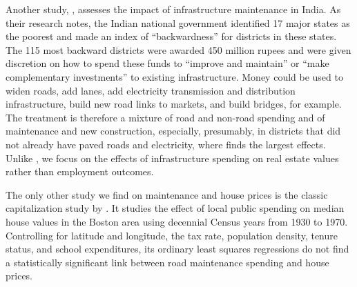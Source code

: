 Another study, \cite{chaurey2022}, assesses the impact of infrastructure maintenance in India. As their research notes, the Indian national government identified 17 major states as the poorest and made an index of ``backwardness'' for districts in these states. The 115 most backward districts were awarded 450 million rupees and were given discretion on how to spend these funds to ``improve and maintain'' or ``make complementary investments'' to existing infrastructure.  Money could be used to widen roads, add lanes, add electricity transmission and distribution infrastructure, build new road links to markets, and build bridges, for example.  The treatment is therefore a mixture of road and non-road spending and of maintenance and new construction, especially, presumably, in districts that did not already have paved roads and electricity, where \cite{chaurey2022} finds the largest effects. 
Unlike \cite{chaurey2022}, we focus on the effects of infrastructure spending on real estate values rather than employment outcomes.

The only other study we find on maintenance and house prices is the classic capitalization study by \cite{edel1974taxes}. It studies the effect of local public spending on median house values in the Boston area using decennial Census years from 1930 to 1970. Controlling for latitude and longitude, the tax rate, population density, tenure status, and school expenditures, its ordinary least squares regressions do not find a statistically significant link between road maintenance spending and house prices.

